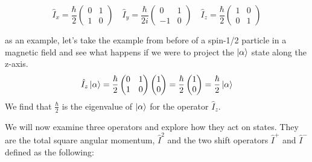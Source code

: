 \begin{equation}
  \hat{I}_x=\frac{\hbar}{2}\begin{pmatrix}
    0 & 1\\
    1 & 0
\end{pmatrix}\quad
\hat{I}_y=\frac{\hbar}{2i}\begin{pmatrix}
  0 & 1\\
  -1 & 0
\end{pmatrix}\quad
\hat{I}_z=\frac{\hbar}{2}\begin{pmatrix}
  1 & 0\\
  0 & 1
\end{pmatrix}
\end{equation}

as an example, let's take the example from before of a spin-1/2 particle in a magnetic field
and see what happens if we were to project the $\ket{\alpha}$ state along the z-axis.
\begin{equation}\label{eqn:operators}
  \hat{I}_z\ket{\alpha} = \frac{\hbar}{2}\begin{pmatrix}
    0 & 1\\
    1 & 0
\end{pmatrix}
\begin{pmatrix}
  1\\
  0
\end{pmatrix} = \frac{\hbar}{2}\begin{pmatrix}
  1\\
  0
\end{pmatrix} = \frac{\hbar}{2}\ket{\alpha}
\end{equation}
We find that $\frac{\hbar}{2}$ is the eigenvalue of $\ket{\alpha}$ for the operator $\hat{I}_z$.

We will now examine three operators and explore how they act on states. They are the total square angular momentum, $\hat{I}^2$ and the two shift operators $\hat{I}^+$ and $\hat{I}^-$ defined as the following:

